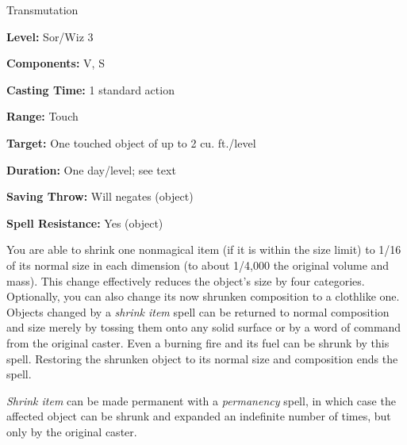 
Transmutation

\textbf{Level:} Sor/Wiz 3

\textbf{Components:} V, S

\textbf{Casting Time:} 1 standard action

\textbf{Range:} Touch

\textbf{Target:} One touched object of up to 2 cu. ft./level

\textbf{Duration:} One day/level; see text

\textbf{Saving Throw:} Will negates (object)

\textbf{Spell Resistance:} Yes (object)

You are able to shrink one nonmagical item (if it is within the size limit) to 
1/16 of its normal size in each dimension (to about 1/4,000 the original volume 
and mass). This change effectively reduces the object's size by four categories. 
Optionally, you can also change its now shrunken composition to a clothlike one. 
Objects changed by a \textit{shrink item} spell can be returned to normal composition 
and size merely by tossing them onto any solid surface or by a word of command 
from the original caster. Even a burning fire and its fuel can be shrunk by this 
spell. Restoring the shrunken object to its normal size and composition ends the 
spell.

\textit{Shrink item} can be made permanent with a \textit{permanency} spell, in 
which case the affected object can be shrunk and expanded an indefinite number 
of times, but only by the original caster.

